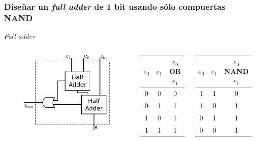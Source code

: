 \documentclass[mathserif,hyperref]{beamer}
\begin{document}
\begin{frame}[t]
\frametitle{\small Diseñar un \textit{full adder} de 1 bit usando sólo
compuertas NAND}
\textit{Full adder}
\begin{columns}[T]
  \begin{figure}[htp]
    \includegraphics[scale=0.6]{fulladder.pdf}
  \end{figure}

  \begin{center}\begin{tabular}{| c | c || c |}
    \hline
    $e_0$ & $e_1$ & $e_0$ OR $e_1$ \\ \hline
      0   &   0   &        0       \\
      0   &   1   &        1       \\
      1   &   0   &        1       \\
      1   &   1   &        1       \\
    \hline
  \end{tabular}\end{center}
  \pause
  \begin{center}\begin{tabular}{| c | c || c |}
    \hline
    $e_0$ & $e_1$ & $e_0$ NAND $e_1$ \\ \hline
      1   &   1   &         0        \\
      1   &   0   &         1        \\
      0   &   1   &         1        \\
      0   &   0   &         1        \\
    \hline
  \end{tabular}\end{center}
\end{columns}
\end{frame}
\end{document}

